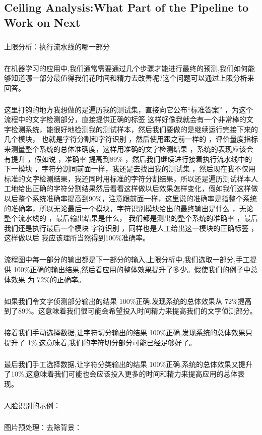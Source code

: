 \documentclass{article}
\begin{document}
\begin{CJK}{UTF8}{gbsn}
\subsection{Ceiling Analysis:What Part of the Pipeline to Work on Next}
\subparagraph{}
上限分析：执行流水线的哪一部分
\subparagraph{}
在机器学习的应用中,我们通常需要通过几个步骤才能进行最终的预测,我们如何能够知道哪一部分最值得我们花时间和精力去改善呢?这个问题可以通过上限分析来回答。
\subparagraph{}
这里打钩的地方我想做的是遍历我的测试集，直接向它公布“标准答案” ，为这个流程中的文字检测部分，直接提供正确的标签 这样好像我就会有一个非常棒的文字检测系统，能很好地检测我的测试样本，然后我们要做的是继续运行完接下来的几个模块， 也就是字符分割和字符识别 ，然后使用跟之前一样的 ，评价量度指标来测量整个系统的总体准确度，这样用准确的文字检测结果 ，系统的表现应该会有提升 ，假如说 ，准确率 提高到89\%{} ，然后我们继续进行接着执行流水线中的下一模块 ，字符分割同前面一样，我还是去找出我的测试集 ，然后现在我不仅用标准的文字检测结果，我还同时用标准的字符分割结果，所以还是遍历测试样本人工地给出正确的字符分割结果然后看看这样做以后效果怎样变化，假如我们这样做以后整个系统准确率提高到90\%{}，注意跟前面一样，这里说的准确率是指整个系统的准确率，所以无论最后一个模块，字符识别模块给出的最终输出是什么 ，无论整个流水线的 ，最后输出结果是什么， 我们都是测出的整个系统的准确率 ，最后我们还是执行最后一个模块 字符识别 ，同样也是人工给出这一模块的正确标签 ，这样做以后 我应该理所当然得到100\%{}准确率。 
\begin{figure}[H]
\label{fig:2270}
\end{figure}
\subparagraph{}
流程图中每一部分的输出都是下一部分的输入,上限分析中,我们选取一部分,手工提供 100\%{}正确的输出结果,然后看应用的整体效果提升了多少。假使我们的例子中总体效果
为 72\%{}的正确率。
\subparagraph{}
如果我们令文字侦测部分输出的结果 100\%{}正确,发现系统的总体效果从 72\%{}提高到了89\%{}。这意味着我们很可能会希望投入时间精力来提高我们的文字侦测部分。
\subparagraph{}
接着我们手动选择数据,让字符切分输出的结果 100\%{}正确,发现系统的总体效果只提升了 1\%{},这意味着,我们的字符切分部分可能已经足够好了。
\subparagraph{}
最后我们手工选择数据,让字符分类输出的结果 100\%{}正确,系统的总体效果又提升了10\%{},这意味着我们可能也会应该投入更多的时间和精力来提高应用的总体表现。
\subparagraph{}
人脸识别的示例：
\begin{figure}[H]
\label{fig:2271}
\end{figure}
\subparagraph{}
图片预处理：去除背景：
\begin{figure}[H]

\end{figure}
\end{CJK}
\end{document}
